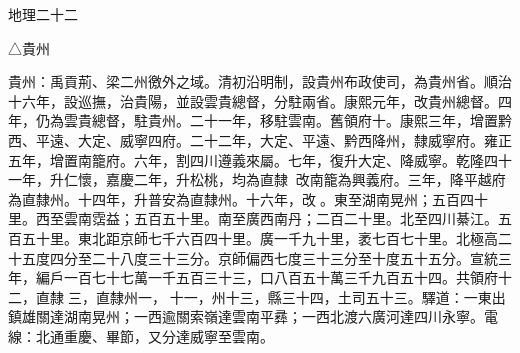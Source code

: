 
\begin{pinyinscope}
地理二十二

△貴州

貴州：禹貢荊、梁二州徼外之域。清初沿明制，設貴州布政使司，為貴州省。順治十六年，設巡撫，治貴陽，並設雲貴總督，分駐兩省。康熙元年，改貴州總督。四年，仍為雲貴總督，駐貴州。二十一年，移駐雲南。舊領府十。康熙三年，增置黔西、平遠、大定、威寧四府。二十二年，大定、平遠、黔西降州，隸威寧府。雍正五年，增置南籠府。六年，割四川遵義來屬。七年，復升大定、降威寧。乾隆四十一年，升仁懷，嘉慶二年，升松桃，均為直隸，改南籠為興義府。三年，降平越府為直隸州。十四年，升普安為直隸州。十六年，改。東至湖南晃州；五百四十里。西至雲南霑益；五百五十里。南至廣西南丹；二百二十里。北至四川綦江。五百五十里。東北距京師七千六百四十里。廣一千九十里，袤七百七十里。北極高二十五度四分至二十八度三十三分。京師偏西七度三十三分至十度五十五分。宣統三年，編戶一百七十七萬一千五百三十三，口八百五十萬三千九百五十四。共領府十二，直隸三，直隸州一，十一，州十三，縣三十四，土司五十三。驛道：一東出鎮雄關達湖南晃州；一西逾關索嶺達雲南平彞；一西北渡六廣河達四川永寧。電線：北通重慶、畢節，又分達威寧至雲南。


\end{pinyinscope}
